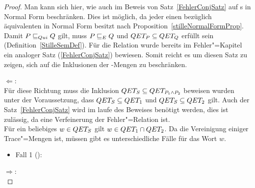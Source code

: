 \begin{proof}
  Man kann sich hier, wie auch im Beweis von Satz~\ref{FehlerConjSatz} auf
  \MEIO{}s in Normal Form beschränken. Dies ist möglich, da jeder \MEIO{} einen
  bezüglich \QRel{} äquivalenten \MEIO{} in Normal Form besitzt nach
  Proposition~\ref{stilleNormalFormProp}.\\
  Damit $P \sqsubseteq  _{Qui} Q$ gilt, muss $P \sqsubseteq  _E Q$ und $QET _P \subseteq QET _Q$
  erfüllt sein (Definition~\ref{StilleSemDef}). Für die Relation \ERel{} wurde
  bereits im Fehler"=Kapitel ein analoger Satz (\ref{FehlerConjSatz}) bewiesen.
  Somit reicht es um diesen Satz zu zeigen, sich auf die Inklusionen der
  \QET{}-Mengen zu beschränken.


  \glqq $\Leftarrow$\grqq{}:\\
  Für diese Richtung muss die Inklusion $QET _S\subseteq QET _{P_1\land P_2}$
  beweisen wurden unter der Voraussetzung, dass $QET _S\subseteq QET _1$ und
  $QET _S\subseteq QET _2$ gilt. Auch der Satz~\ref{FehlerConjSatz} wird im
  laufe des Beweises benötigt werden, dies ist zulässig, da \QRel{} eine
  Verfeinerung der Fehler"=Relation \ERel{} ist.\\
  Für ein beliebiges $w\in QET _S$ gilt $w\in QET _1\cap QET _2$. Da \QET{}
  die Vereinigung einiger Trace"=Mengen ist, müssen gibt es unterschiedliche
  Fälle für das Wort $w$.
  \begin{itemize}
    \item Fall 1 ():
  \end{itemize}

  \glqq $\Rightarrow$\grqq{}:\\
\end{proof}
